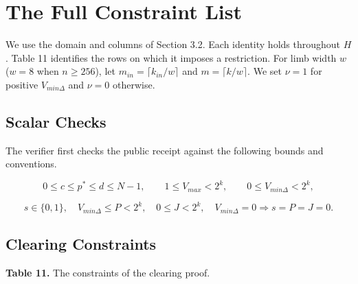 

\section{The Full Constraint List}

We use the domain and columns of Section 3.2. Each identity holds throughout \(H\). Table 11 identifies the rows on which it imposes a restriction. For limb width \(w\) (\(w=8\) when \(n\ge256\)), let \(m_{in}=\lceil k_{in}/w\rceil\) and \(m=\lceil k/w\rceil\). We set \(\nu=1\) for positive \(V_{min\Delta}\) and \(\nu=0\) otherwise.

\subsection{Scalar Checks}

The verifier first checks the public receipt against the following bounds and conventions.

\[0 \le c \le p^* \le d \le N-1, \qquad 1 \le V_{max} < 2^k, \qquad 0 \le V_{min\Delta} < 2^k,\]

\[
s \in \{0,1\}, \quad
V_{min\Delta} \le P < 2^k, \quad
0 \le J < 2^k, \quad
V_{min\Delta} = 0 \Rightarrow s = P = J = 0.
\]

\subsection{Clearing Constraints}

\textbf{Table 11.} The constraints of the clearing proof.

\begingroup
\small
\setlength{\tabcolsep}{3pt}

